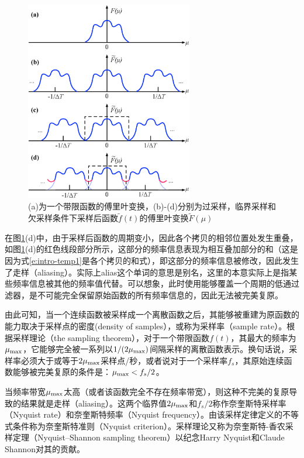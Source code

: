 \begin{figure}
	\sidecaption
	\includegraphics[width=0.65\textwidth]{figures/intro/sampling-aliasing}
	\caption{(a)为一个带限函数的傅里叶变换，(b)-(d)分别为过采样，临界采样和欠采样条件下采样后函数$\tilde{f}(t)$的傅里叶变换$\tilde{F}(\mu)$}
	\label{f:intro-sampling-aliasing}
\end{figure}

在图\ref{f:intro-sampling-aliasing}(d)中，由于采样后函数的周期变小，因此各个拷贝的相邻位置处发生重叠，如图\ref{f:intro-sampling-aliasing}(d)的红色线段部分所示，这部分的频率信息表现为相互叠加部分的和（这是因为式\ref{e:intro-temp1}是各个拷贝的和式），即这部分的频率信息被修改，因此发生了走样（aliasing）。实际上alias这个单词的意思是别名，这里的本意实际上是指某些频率信息被其他的频率值代替。可以想象，此时使用能够覆盖一个周期的低通过滤器，是不可能完全保留原始函数的所有频率信息的，因此无法被完美复原。

由此可知，当一个连续函数被采样成一个离散函数之后，其能够被重建为原函数的能力取决于采样点的密度(density of samples），或称为采样率（sample rate）。根据采样理论（the sampling theorem），对于一个带限函数$f(t)$，其最大的频率为$\mu_{\rm max}$，它能够完全被一系列以$1/(2\mu_{\rm max})$间隔采样的离散函数表示。换句话说，采样率必须大于或等于$2\mu_{\rm max}$采样点/秒，或者说对于一个采样率$f_s$，其原始连续函数能够被完美复原的条件是：$\mu_{\rm max}<f_s/2$。

当频率带宽$\mu_{\rm max}$太高（或者该函数完全不存在频率带宽），则这种不完美的复原导致的结果就是走样（aliasing）。这两个临界值$2\mu_{\rm max}$和$f_s/2$称作奈奎斯特采样率（Nyquist rate）和奈奎斯特频率（Nyquist frequency）。由该采样定律定义的不等式条件称为奈奎斯特准则（Nyquist criterion）。采样理论又称为奈奎斯特-香农采样定理（Nyquist–Shannon sampling theorem）以纪念Harry Nyquist和Claude Shannon对其的贡献。 

